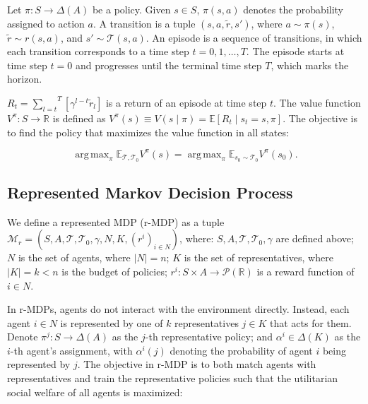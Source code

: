 \documentclass[letterpaper]{article} %
\DeclareMathOperator*{\argmax}{arg\,max}
\begin{document}
Let $\pi: S \rightarrow \Delta(A)$ be a policy. Given $s \in S$, $\pi(s, a)$ denotes the probability assigned to action $a$. A transition is a tuple $(s, a, \tilde{r}, s')$, where $a \sim \pi(s)$, $\tilde{r} \sim r(s,a)$, and $s' \sim \mathcal{T}(s, a)$. An episode is a sequence of transitions, in which each transition corresponds to a time step $t = 0, 1, \dots, T$. The episode starts at time step $t = 0$ and progresses until the terminal time step $T$, which marks the horizon.%

$R_t = \overset{T}{\underset{l=t}{\sum}} \left[ \gamma^{l-t} \tilde{r}_l  \right]$ is a return of an episode at time step $t$. The value function $V^\pi: S \rightarrow \mathbb{R}$ is defined as $V^\pi(s) \equiv V(s \mid \pi) = \mathbb{E} [ R_t \mid s_t = s, \pi ]$. The objective is to find the policy that maximizes the value function in all states:

\begin{equation}
\argmax_{\pi} \mathbb{E}_{\mathcal{T}, \mathcal{T}_0} V^\pi(s) = \argmax_{\pi} \mathbb{E}_{s_0 \sim \mathcal{T}_0} V^\pi(s_0).
\end{equation}



\subsection{Represented Markov Decision Process}
\label{sec:problem_represented}


We define a represented MDP (r-MDP) as a tuple $\mathcal{M}_r = (S, A, \mathcal{T}, \mathcal{T}_0, \gamma, N, K, (r^i)_{i \in N})$, where: $S, A, \mathcal{T}, \mathcal{T}_0, \gamma$ are defined above; $N$ is the set of agents, where $\left| N \right| = n$; $K$ is the set of representatives, where $\left| K \right| = k < n$ is the budget of policies; $r^i: S \times A \rightarrow \mathcal{P}(\mathbb{R})$ is a reward function of $i \in N$.

In r-MDPs, agents do not interact with the environment directly. Instead, each agent $i \in N$ is represented by one of $k$ representatives $j \in K$ that acts for them. Denote $\pi^j: S \rightarrow \Delta(A)$ as the $j$-th representative policy; and $\alpha^i \in \Delta(K)$ as the $i$-th agent's assignment, with $\alpha^i(j)$ denoting the probability of agent $i$ being represented by $j$. The objective in r-MDP is to both match agents with representatives and train the representative policies such that the utilitarian social welfare of all agents is maximized:
\end{document}
